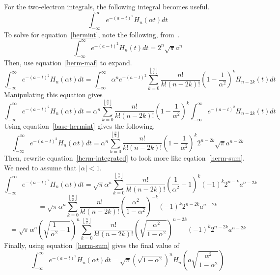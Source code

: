For the two-electron integrals, the following integral becomes useful.
\begin{equation}
  \int_{-\infty}^\infty e^{-\left(a - t\right)^2} H_{n}\left(\alpha t\right) dt
  \label{hermint}
\end{equation}
To solve for equation~\ref{hermint}, note the following, from~\cite{wolfram-hermite}.
\begin{equation}
  \int_{-\infty}^\infty e^{-\left(a - t\right)^2} H_{n}\left(t\right) dt = 2^n \sqrt{\pi} a^n
  \label{base-hermint}
\end{equation}
Then, use equation~\ref{herm-maf} to expand.
\begin{equation}
  \int_{-\infty}^\infty e^{-(a - t)^2} H_n(\alpha t) dt = \int_{-\infty}^\infty \alpha^n e^{-(a - t)^2} \sum_{k = 0}^{\left\lfloor\frac{n}{2}\right\rfloor} \frac{n!}{k!(n - 2k)!}\left(1 - \frac{1}{\alpha^2}\right)^k H_{n - 2k}(t) dt
\end{equation}
Manipulating this equation gives
\begin{equation}
  \int_{-\infty}^\infty e^{-(a - t)^2} H_n(\alpha t) dt = \alpha^n \sum_{k = 0}^{\left\lfloor\frac{n}{2}\right\rfloor} \frac{n!}{k!(n - 2k)!}\left(1 - \frac{1}{\alpha^2}\right)^k \int_{-\infty}^\infty e^{-(a - t)^2} H_{n - 2k}(t) dt
\end{equation}
Using equation~\ref{base-hermint} gives the following.
\begin{equation}
  \int_{-\infty}^\infty e^{-(a - t)^2} H_n(\alpha t) dt = \alpha^n \sum_{k = 0}^{\left\lfloor\frac{n}{2}\right\rfloor} \frac{n!}{k!(n - 2k)!}\left(1 - \frac{1}{\alpha^2}\right)^k 2^{n - 2k} \sqrt{\pi} a^{n - 2k}
  \label{herm-integrated}
\end{equation}
Then, rewrite equation~\ref{herm-integrated} to look more like eqation~\ref{herm-sum}. We need to assume that $\left|\alpha \right| < 1$.
\begin{equation}
  \int_{-\infty}^\infty e^{-(a - t)^2} H_n(\alpha t) dt = \sqrt{\pi} \alpha^n \sum_{k = 0}^{\left\lfloor\frac{n}{2}\right\rfloor} \frac{n!}{k!(n - 2k)!} \left(\frac{1}{\alpha^2} - 1\right)^k (-1)^k 2^{n - k} a^{n - 2k}
\end{equation}
\begin{equation}
  = \sqrt{\pi} \alpha^n \sum_{k = 0}^{\left\lfloor\frac{n}{2}\right\rfloor} \frac{n!}{k!(n - 2k)!} \left(\frac{\alpha^2}{1 - \alpha^2}\right)^{-k} (-1)^k 2^{n - 2k} a^{n - 2k}
\end{equation}
\begin{equation}
  = \sqrt{\pi} \alpha^n \left(\sqrt{\frac{1}{\alpha^2} - 1}\right)^n \sum_{k = 0}^{\left\lfloor\frac{n}{2}\right\rfloor} \frac{n!}{k!(n - 2k)!}\left(\sqrt{\frac{\alpha^2}{1 - \alpha^2}}\right)^{n - 2k} (-1)^k 2^{n - 2k} a^{n - 2k}
  \label{herm-rearranged}
\end{equation}
Finally, using equation~\ref{herm-sum} gives the final value of
\begin{equation}
  \int_{-\infty}^\infty e^{-(a - t)^2} H_n(\alpha t) dt = \sqrt{\pi}\left(\sqrt{1 - \alpha^2}\right)^n H_n\left(a\sqrt{\frac{\alpha^2}{1 - \alpha^2}}\right)
  \label{herm-int-solved}
\end{equation}
  
